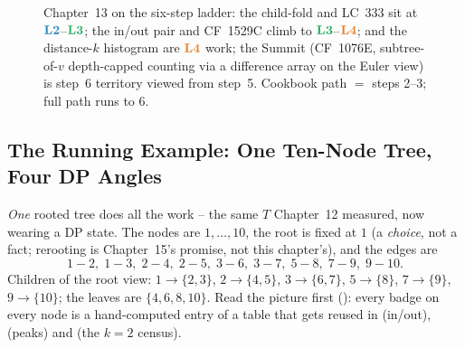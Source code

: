 \begin{figure}[H]
\centering
{}
\caption*{Chapter~13 on the six-step ladder: the child-fold and LC~333 sit
at $\lv2$--$\lv3$; the in/out pair and CF~1529C climb to $\lv3$--$\lv4$;
 and the distance-$k$ histogram are $\lv4$ work; the
Summit (CF~1076E, subtree-of-$v$ depth-capped counting via a difference
array on the Euler view) is step~6 territory viewed from step~5. Cookbook
path $=$ steps 2--3; full path runs to 6.}
\end{figure}

\subsection*{The Running Example: One Ten-Node Tree, Four DP Angles}

\emph{One} rooted tree does all the work -- the same $T$ Chapter~12 measured,
now wearing a DP state. The nodes are $1,\dots,10$, the root is fixed at $1$
(a \emph{choice}, not a fact; rerooting is Chapter~15's promise, not this
chapter's), and the edges are
\[
  1\!-\!2,\; 1\!-\!3,\; 2\!-\!4,\; 2\!-\!5,\; 3\!-\!6,\; 3\!-\!7,\; 5\!-\!8,\; 7\!-\!9,\; 9\!-\!10 .
\]
Children of the root view: $1 \!\to\! \{2,3\}$, $2 \!\to\! \{4,5\}$,
$3 \!\to\! \{6,7\}$, $5 \!\to\! \{8\}$, $7 \!\to\! \{9\}$, $9 \!\to\! \{10\}$;
the leaves are $\{4,6,8,10\}$. Read the picture first ():
every badge on every node is a hand-computed entry of a table that gets reused
in  (in/out),  (peaks) and
 (the $k=2$ census).

